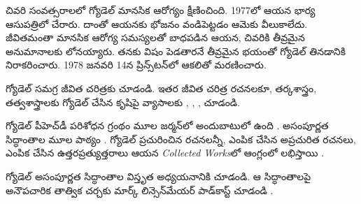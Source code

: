 \documentclass[../../../include/open-logic-section]{subfiles}
\begin{document}
చివరి సంవత్సరాలలో గ్యోడెల్ మానసిక ఆరోగ్యం క్షీణించింది. 1977లో ఆయన భార్య ఆసుపత్రిలో చేరారు. దాంతో ఆయనకు భోజనం వండిపెట్టడం ఆమెకు వీలుకాలేదు. జీవితమంతా మానసిక ఆరోగ్య సమస్యలతో బాధపడిన ఆయన, చివరికి తీవ్రమైన అనుమానాలకు లోనయ్యారు. తనకు విషం పెడతారనే తీవ్రమైన భయంతో గ్యోడెల్ తినడానికి నిరాకరించారు. 1978 జనవరి 14న ప్రిన్స్‌టన్‌లో ఆకలితో మరణించారు.

\begin{reading}
గ్యోడెల్ సమగ్ర జీవిత చరిత్రకు \citet{Dawson1997} చూడండి. ఇతర జీవిత చరిత్ర రచనలకూ, తర్కశాస్త్రం, తత్వశాస్త్రాలకు గ్యోడెల్ చేసిన కృషిపై వ్యాసాలకు \citet{Wang1990}, \citet{Baaz2011}, \citet{Takeuti2003}, \citet{Sigmund2007} చూడండి.

గ్యోడెల్ పీహెచ్‌డీ పరిశోధన గ్రంథం మూల జర్మన్‌లో అందుబాటులో ఉంది \citep{Godel1929}. అసంపూర్ణత సిద్ధాంతాల మూల పాఠ్యం \citep{Godel1931}. గ్యోడెల్ ప్రచురించిన రచనలన్నీ, ఎంపిక చేసిన అప్రచురిత రచనలు, ఎంపిక చేసిన ఉత్తరప్రత్యుత్తరాలు ఆయన \emph{Collected Works}లో ఆంగ్లంలో లభిస్తాయి \citet{Godel1986,Godel1990}.

గ్యోడెల్ అసంపూర్ణత సిద్ధాంతాల విస్తృత అధ్యయనానికి \citet{Smith2013} చూడండి. ఆ సిద్ధాంతాలపై అనౌపచారిక తాత్విక చర్చకు మార్క్ లిన్సెన్‌మేయర్ పాడ్‌కాస్ట్ చూడండి \citep{Linsenmayer2014}.
\end{reading}
\end{document}
